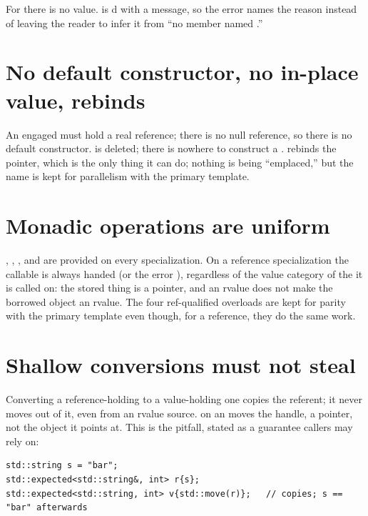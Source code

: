 \documentclass[a4paper,10pt,oneside,openany,final,article]{memoir}
\begin{document}
For  there is no value.  is
d with a message, so the error names the reason instead of
leaving the reader to infer it from ``no member named .''

\section{No default constructor, no in-place value,  rebinds}

An engaged  must hold a real reference; there is no null
reference, so there is no default constructor. 
is deleted; there is nowhere to construct a . 
rebinds the pointer, which is the only thing it can do; nothing is being
``emplaced,'' but the name is kept for parallelism with the primary template.

\section{Monadic operations are uniform}

, , , and
 are provided on every specialization. On a reference
specialization the callable is always handed  (or the error
), regardless of the value category of the  it is
called on: the stored thing is a pointer, and an rvalue  does
not make the borrowed object an rvalue. The four ref-qualified overloads are
kept for parity with the primary template even though, for a reference, they do
the same work.

\section{Shallow conversions must not steal}

Converting a reference-holding  to a value-holding one copies
the referent; it never moves out of it, even from an rvalue source.
 on an  moves the handle, a pointer,
not the object it points at. This is the 
pitfall, stated as a guarantee callers may rely on:

\begin{verbatim}
std::string s = "bar";
std::expected<std::string&, int> r{s};
std::expected<std::string, int> v{std::move(r)};   // copies; s == "bar" afterwards
\end{verbatim}
\end{document}
